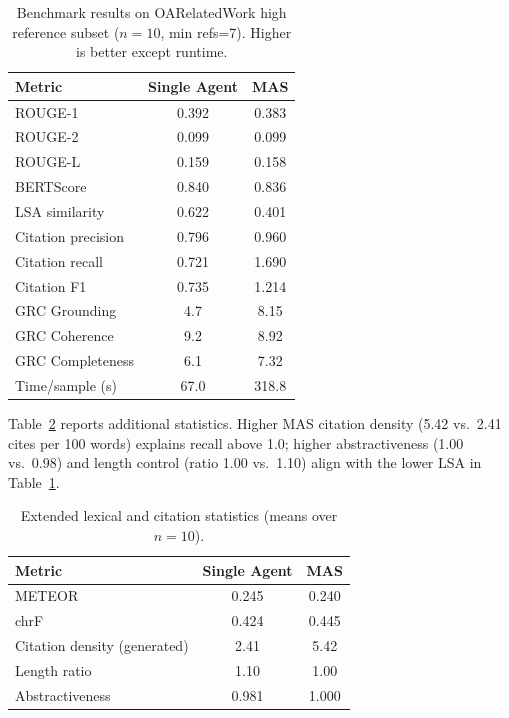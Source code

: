 \documentclass[conference]{IEEEtran}
\begin{document}
\begin{table}[t]
\caption{Benchmark results on OARelatedWork high reference subset ($n=10$, min refs=7). Higher is better except runtime.}
\label{tab:results}
\centering
\small
\begin{tabular}{lcc}
\toprule
\textbf{Metric} & \textbf{Single Agent} & \textbf{MAS} \\
\midrule
ROUGE-1 & 0.392 & 0.383 \\
ROUGE-2 & 0.099 & 0.099 \\
ROUGE-L & 0.159 & 0.158 \\
BERTScore & 0.840 & 0.836 \\
LSA similarity & 0.622 & 0.401 \\
\midrule
Citation precision & 0.796 & 0.960 \\
Citation recall & 0.721 & 1.690 \\
Citation F1 & 0.735 & 1.214 \\
\midrule
GRC Grounding & 4.7 & 8.15 \\
GRC Coherence & 9.2 & 8.92 \\
GRC Completeness & 6.1 & 7.32 \\
\midrule
Time/sample (s) & 67.0 & 318.8 \\
\bottomrule
\end{tabular}
\end{table}
\vspace{0.6\baselineskip}

Table~\ref{tab:extended} reports additional statistics. Higher MAS citation density (5.42 vs.\ 2.41 cites per 100 words) explains recall above 1.0; higher abstractiveness (1.00 vs.\ 0.98) and length control (ratio 1.00 vs.\ 1.10) align with the lower LSA in Table~\ref{tab:results}.

\begin{table}[t]
\caption{Extended lexical and citation statistics (means over $n=10$).}
\label{tab:extended}
\centering
\small
\begin{tabular}{lcc}
\toprule
\textbf{Metric} & \textbf{Single Agent} & \textbf{MAS} \\
\midrule
METEOR & 0.245 & 0.240 \\
chrF & 0.424 & 0.445 \\
Citation density (generated) & 2.41 & 5.42 \\
Length ratio & 1.10 & 1.00 \\
Abstractiveness & 0.981 & 1.000 \\
\bottomrule
\end{tabular}
\end{table}
\end{document}
